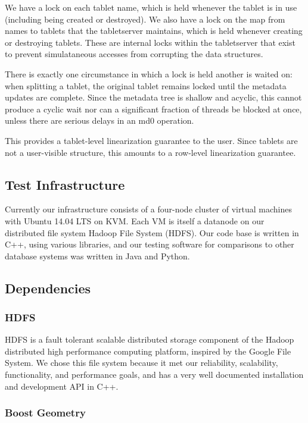 \documentclass[11pt]{article}
\begin{document}
We have a lock on each tablet name, which is held whenever the tablet is in use (including being created or destroyed).  We also have a lock on the map from names to tablets that the tabletserver maintains, which is held whenever creating or destroying tablets.  These are internal locks within the tabletserver that exist to prevent simulataneous accesses from corrupting the data structures.

There is exactly one circumstance in which a lock is held another is waited on: when splitting a tablet, the original tablet remains locked until the metadata updates are complete.  Since the metadata tree is shallow and acyclic, this cannot produce a cyclic wait nor can a significant fraction of threads be blocked at once, unless there are serious delays in an md0 operation.

This provides a tablet-level linearization guarantee to the user.  Since tablets are not a user-visible structure, this amounts to a row-level linearization guarantee.

\subsection{Test Infrastructure}

Currently our infrastructure consists of a four-node cluster of virtual machines with Ubuntu 14.04 LTS on KVM. Each VM is itself a datanode on our distributed file system Hadoop File System (HDFS)\cite{hdfs}. Our code base is written in C++, using various libraries, and our testing software for comparisons to other database systems was written in Java and Python.

\subsection{Dependencies}

\subsubsection{HDFS}

HDFS is a fault tolerant scalable distributed storage component of the Hadoop distributed high performance computing platform, inspired by the Google File System. We chose this file system because it met our reliability, scalability, functionality, and performance goals, and has a very well documented installation and development API in C++. 

\subsubsection{Boost Geometry}
\end{document}
